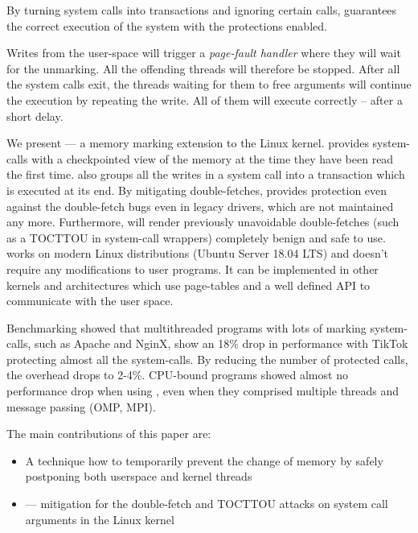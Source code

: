 By turning system calls into transactions and ignoring certain calls, \sysname
guarantees the correct execution of the system with the protections enabled.

Writes from the user-space will trigger a \emph{page-fault handler} where they
will wait for the unmarking. All the offending threads will therefore be stopped.
After all the system calls exit, the threads waiting for them to free arguments
will continue the execution by repeating the write. All of them will execute
correctly -- after a short delay.

We present \sysname --- a memory marking extension to the Linux kernel. \sysname
provides system-calls with a checkpointed view of the memory at the time they
have been read the first time. \sysname also groups all the writes in a system
call into a transaction which is executed at its end. By mitigating
double-fetches, \sysname provides protection even against the double-fetch bugs
even in legacy drivers, which are not maintained any more. Furthermore, \sysname
will render previously unavoidable double-fetches (such as a TOCTTOU in
system-call wrappers) completely benign and safe to use. \sysname works on modern
Linux distributions (Ubuntu Server 18.04 LTS) and doesn't require any
modifications to user programs. It can be implemented in other kernels
and architectures which use page-tables and a well defined API to communicate
with the user space.

Benchmarking \sysname showed that multithreaded programs with lots of marking
system-calls, such as Apache and NginX, show an 18\% drop in performance with
TikTok protecting almost all the system-calls. By reducing the number of
protected calls, the overhead drops to 2-4\%. CPU-bound programs showed almost
no performance drop when using \sysname, even when they comprised multiple
threads and message passing (OMP, MPI).


The main contributions of this paper are:


\begin{itemize}
\item A technique how to temporarily prevent the change of memory by safely
      postponing both userspace and kernel threads
\item \sysname --- mitigation for the double-fetch and TOCTTOU attacks on system
      call arguments in the Linux kernel
\end{itemize}

